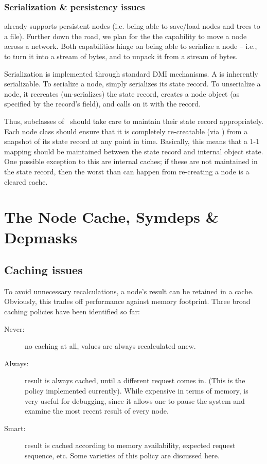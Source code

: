 \subsection{Serialization \& persistency issues}

   already supports persistent nodes (i.e. being able to
  save/load nodes and trees to a file). Further down the road, we plan for the
  the capability to move a node across a network. Both capabilities hinge on
  being able to serialize a node -- i.e., to turn it into a stream of bytes,
  and to unpack it from a stream of bytes.

  Serialization is implemented through standard DMI mechanisms. A
   is inherently serializable. To serialize a node,
   simply serializes its state record. To unserialize a node, it
  recreates (un-serializes) the state record, creates a node object (as
  specified by the record's  field), and calls  on it with
  the record. 

  Thus, subclasses of \Node\ should take care to maintain their state record
  appropriately. Each node class should ensure that it is completely
  re-creatable (via ) from a snapshot of its state record at any
  point in time. Basically, this means that a 1-1 mapping should be maintained
  between the state record and internal object state. One possible exception to
  this are internal caches; if these are not maintained in the state record,
  then the worst than can happen from re-creating a node is a cleared cache.
  
\chapter{The Node Cache, Symdeps \& Depmasks}

\section{Caching issues}
  \label{sec:cache}

  To avoid unnecessary recalculations, a node's result can be retained in a
  cache. Obviously, this trades off performance against memory footprint. Three
  broad caching policies have been identified so far:

  \begin{description}
  
  \item[Never:] no caching at all, values are always recalculated anew. 
   
  \item[Always:] result is always cached, until a different request comes in.
    (This is the policy implemented currently). While expensive in terms of
    memory, is very useful for debugging, since it allows one to pause the
    system and examine the most recent result of every node.

  \item[Smart:] result is cached according to memory availability, expected
    request sequence, etc. Some varieties of this policy are discussed here.

  \end{description}
  
